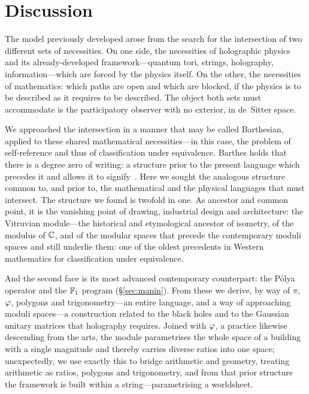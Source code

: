 \section{Discussion}\label{sec:discussion}

The model previously developed arose from the search for the intersection of two
different sets of necessities. On one side, the necessities of holographic physics and
its already-developed framework---quantum tori, strings, holography, information---which
are forced by the physics itself. On the other, the necessities of mathematics: which
paths are open and which are blocked, if the physics is to be described as it requires to
be described. The object both sets must accommodate is the participatory observer with no
exterior, in de~Sitter space.

We approached the intersection in a manner that may be called Barthesian, applied to
these shared mathematical necessities---in this case, the problem of self-reference and
thus of classification under equivalence.
Barthes holds that there is a degree zero of writing: a structure prior to the present
language which precedes it and allows it to signify~\cite{Barthes53}. Here we sought the
analogous structure common to, and prior to, the mathematical and the physical languages
that must intersect. The structure we found is twofold in one. As ancestor and common
point, it is the vanishing point of drawing, industrial design and architecture: the
Vitruvian module---the historical and etymological ancestor of isometry, of the modulus
of $\mathbb{C}$, and of the modular spaces that precede the contemporary moduli spaces and still
underlie them: one of the oldest precedents in Western mathematics for classification
under equivalence.

And the second face is its most advanced contemporary counterpart: the P\'olya operator
and the $\mathbb{F}_1$ program (\S\ref{sec:manin}). From these we derive, by way of $\pi$,
$\varphi$, polygons and trigonometry---an entire language, and a way of approaching
moduli spaces---a construction related to the black holes and to the Gaussian unitary
matrices that holography requires. Joined with $\varphi$, a practice likewise descending
from the arts, the module parametrises the whole space of a building with a single
magnitude and thereby carries diverse ratios into one space; unexpectedly, we use exactly
this to bridge arithmetic and geometry, treating arithmetic as ratios, polygons and
trigonometry, and from that
prior structure the framework is built within a string---parametrising a worldsheet.

